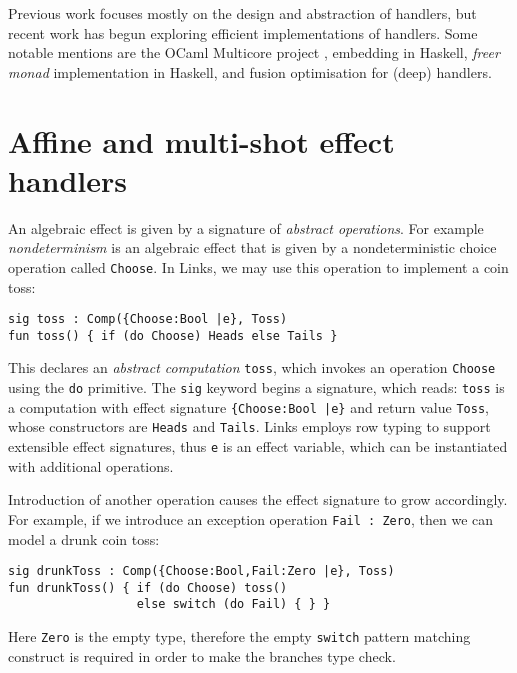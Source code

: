 \documentclass[preprint,numbers]{sigplanconf}
\begin{document}
Previous work focuses mostly on the design and abstraction of
handlers, but recent work has begun exploring efficient
implementations of handlers. Some notable mentions are the OCaml
Multicore project \cite{Dolan2015}, \citet{Kammar2013} embedding in
Haskell, \citet{Kiselyov2015} \emph{freer monad} implementation in
Haskell, and \citet{Wu2015} fusion optimisation for (deep) handlers.

\section{Affine and multi-shot effect handlers}
An algebraic effect is given by a signature of \emph{abstract
  operations}. For example \emph{nondeterminism} is an algebraic
effect that is given by a nondeterministic choice operation called
\lstinline$Choose$. In Links, we may use this operation to implement a
coin toss:
\begin{lstlisting}
sig toss : Comp({Choose:Bool |e}, Toss)
fun toss() { if (do Choose) Heads else Tails }
\end{lstlisting}
This declares an \emph{abstract computation} \lstinline$toss$, which
invokes an operation \lstinline$Choose$ using the \lstinline$do$
primitive.  The \lstinline$sig$ keyword begins a signature, which
reads: \lstinline$toss$ is a computation with effect signature
\lstinline${Choose:Bool |e}$ and return value \lstinline$Toss$, whose
constructors are \lstinline$Heads$ and \lstinline$Tails$.  Links
employs row typing to support extensible effect signatures, thus
\lstinline$e$ is an effect variable, which can be instantiated with
additional operations.

Introduction of another operation causes the effect signature to grow
accordingly. For example, if we introduce an exception operation
\lstinline$Fail : Zero$, then we can model a drunk coin toss:
\begin{lstlisting}
sig drunkToss : Comp({Choose:Bool,Fail:Zero |e}, Toss)
fun drunkToss() { if (do Choose) toss()
                  else switch (do Fail) { } }
\end{lstlisting}
Here \lstinline$Zero$ is the empty type, therefore the empty
\lstinline$switch$ pattern matching construct is required in order to
make the branches type check.
\end{document}

